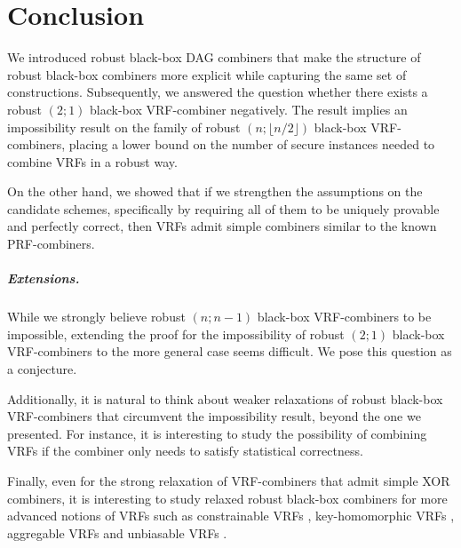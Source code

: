 
\chapter{Conclusion}
\label{ch:conclusion}

We introduced robust black-box DAG combiners that make the structure of robust black-box combiners 
more explicit while capturing the same set of constructions. Subsequently, we answered the question 
whether there exists a robust $(2;1)$ black-box VRF-combiner negatively.
The result implies an impossibility result on the family of robust $(n;\lfloor n/2\rfloor)$ black-box VRF-combiners, 
placing a lower bound on the number of secure instances needed to combine VRFs in a robust way.

On the other hand, we showed that if we strengthen the assumptions on the candidate schemes, specifically
by requiring all of them to be uniquely provable and perfectly correct, then VRFs admit simple combiners
similar to the known PRF-combiners.

\paragraph{Extensions.}
While we strongly believe robust $(n;n-1)$ black-box VRF-combiners to be impossible, extending the proof 
for the impossibility of robust $(2;1)$ black-box VRF-combiners to the more general case seems difficult.
We pose this question as a conjecture.

Additionally, it is natural to think about weaker relaxations of robust black-box VRF-combiners that circumvent the impossibility 
result, beyond the one we presented. For instance, it is interesting to study the possibility of combining VRFs if the combiner only needs to satisfy statistical correctness.

Finally, even for the strong relaxation of VRF-combiners that admit simple XOR combiners, it is interesting to study 
relaxed robust black-box combiners for more advanced notions of VRFs such as 
constrainable VRFs \cite{cryptoeprint:2014/537}, key-homomorphic VRFs \cite{cryptoeprint:2024/643}, aggregable VRFs \cite{cryptoeprint:2024/643} and unbiasable VRFs \cite{cryptoeprint:2024/435}.
